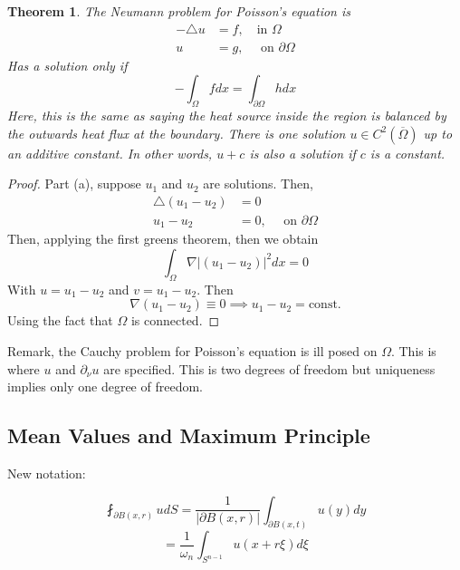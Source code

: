 \documentclass{article}
\newtheorem{theorem}{Theorem}[section]
\newtheorem{one minute paper}[theorem]{One Minute Paper}
\begin{document}
\begin{theorem}
    The Neumann problem for Poisson's equation is 
    \begin{align}
        -\triangle u &= f, \quad \text{in $\Omega$} \\
        u &= g, \quad \text{ on $\partial \Omega$}
    \end{align}
    Has a solution only if 
    \begin{equation}
        -\int_\Omega f dx = \int_{\partial \Omega}h dx
    \end{equation}
    Here, this is the same as saying the heat source inside the region is balanced by the outwards heat flux at the boundary. There is one solution $u \in C^{2}(\overline{\Omega})$ up 
    to an additive constant. In other words, $u+c$ is also a solution if $c$ is a constant. 
\end{theorem}

\begin{proof}
    Part (a), suppose $u_1$ and $u_2$ are solutions. Then, 
    \begin{align}
        \triangle (u_1 - u_2) &= 0 \\
        u_1 - u_2 &= 0, \quad \text{ on $\partial \Omega$}
    \end{align}
    Then, applying the first greens theorem, then we obtain 
    \begin{equation}
        \int_{\Omega}\nabla |(u_1 - u_2)|^2 dx = 0
    \end{equation}
    With $u = u_1 - u_2$ and $v = u_1 - u_2$. Then 
    \begin{equation}
        \nabla (u_1 - u_2) \equiv 0 \implies u_1 - u_2 = \text{const.}
    \end{equation}
    Using the fact that $\Omega$ is connected. 
\end{proof}

Remark, the Cauchy problem for Poisson's equation is ill posed on $\Omega$. This is where $u$ and $\partial_{\nu}u$ are specified. This is two degrees of freedom but uniqueness implies only one degree of freedom. 

\subsection*{Mean Values and Maximum Principle}

New notation: 

\begin{equation}
    \fint_{\partial B(x,r)} u dS = \frac{1}{|\partial B(x,r)|}\int_{\partial B(x,t)}u(y)dy
\end{equation}
\begin{equation}
    = \frac{1}{\omega_n}\int_{S^{n-1}}u(x + r\xi)d\xi
\end{equation}
\end{document}
